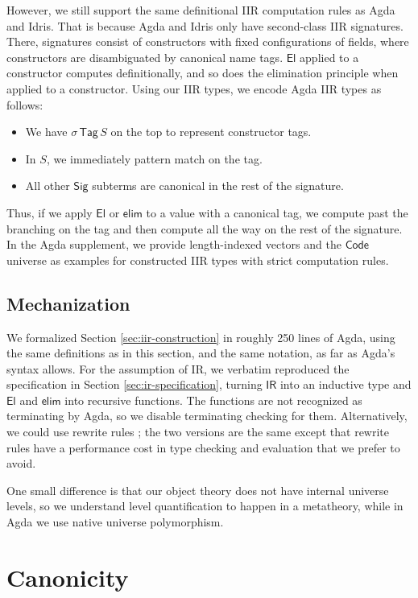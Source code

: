 \documentclass[acmsmall,screen,review,anonymous]{acmart}
\newcommand{\msf}[1]{{\mathsf{#1}}}
\newcommand{\El}{\msf{El}}
\newcommand{\Sig}{\msf{Sig}}
\newcommand{\Code}{\msf{Code}}
\newcommand{\Tag}{\msf{Tag}}
\newcommand{\IR}{\msf{IR}}
\newcommand{\elim}{\msf{elim}}
\begin{document}
However, we still support the same definitional IIR computation rules as Agda and Idris. That is
because Agda and Idris only have second-class IIR signatures. There, signatures consist of
constructors with fixed configurations of fields, where constructors are disambiguated by canonical
name tags. $\El$ applied to a constructor computes definitionally, and so does the elimination
principle when applied to a constructor. Using our IIR types, we encode Agda IIR types as follows:
\begin{itemize}
\item We have $\sigma\,\Tag\,S$ on the top to represent constructor tags.
\item In $S$, we immediately pattern match on the tag.
\item All other $\Sig$ subterms are canonical in the rest of the signature.
\end{itemize}
Thus, if we apply $\El$ or $\elim$ to a value with a canonical tag, we compute past the branching on
the tag and then compute all the way on the rest of the signature. In the Agda supplement, we provide
length-indexed vectors and the $\Code$ universe as examples for constructed IIR types with strict
computation rules.

\subsection{Mechanization}

We formalized Section \ref{sec:iir-construction} in roughly 250 lines of Agda, using the same
definitions as in this section, and the same notation, as far as Agda's syntax allows. For the
assumption of IR, we verbatim reproduced the specification in Section \ref{sec:ir-specification},
turning $\IR$ into an inductive type and $\El$ and $\elim$ into recursive functions. The functions
are not recognized as terminating by Agda, so we disable terminating checking for
them. Alternatively, we could use rewrite rules \cite{DBLP:journals/pacmpl/CockxTW21}; the two
versions are the same except that rewrite rules have a performance cost in type checking and
evaluation that we prefer to avoid.

One small difference is that our object theory does not have internal universe levels, so we
understand level quantification to happen in a metatheory, while in Agda we use native universe
polymorphism.

\section{Canonicity}\label{sec:canonicity}
\end{document}
